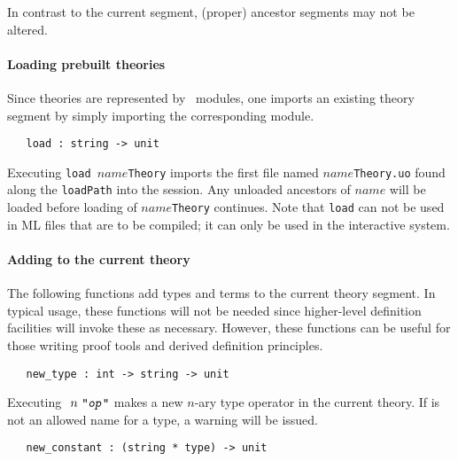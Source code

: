 In contrast to the current segment, (proper) ancestor segments may not
be altered.

\paragraph{Loading prebuilt theories}

Since \HOL{} theories are represented by \ML\ modules, one imports an
existing theory segment by simply importing the corresponding module.

\begin{boxed}
\begin{verbatim}
   load : string -> unit
\end{verbatim}\end{boxed}

\noindent
Executing {\small\verb+load +}$name${\small\verb+Theory+} imports the
first file named $name${\small\verb+Theory.uo+} found along the
{\small\verb+loadPath+} into the session. Any unloaded ancestors of
$name$ will be loaded before loading of $name${\small\verb+Theory+}
continues.  Note that {\small\verb+load+} can not be used in ML files
that are to be compiled; it can only be used in the interactive
system.

\paragraph{Adding to the current theory}

The following \ML{} functions add types and terms to the current
theory segment. In typical usage, these functions will not be
needed since higher-level definition facilities will invoke these as
necessary. However, these functions can be useful for those writing
proof tools and derived definition principles.

\begin{boxed}
\begin{verbatim}
   new_type : int -> string -> unit
\end{verbatim}
\end{boxed}


\noindent Executing $\ n\ \ml{"\ty{op}"}$ makes 
a new $n$-ary type operator in the current theory. If
 is not an allowed name for a type, a warning will be issued.


\begin{boxed}
\begin{verbatim}
   new_constant : (string * type) -> unit
\end{verbatim}
\end{boxed}

